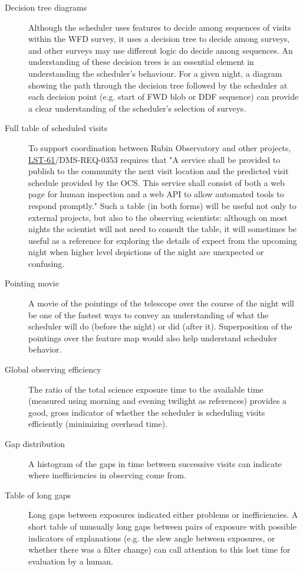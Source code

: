 \begin{description}
\item[{Decision tree diagrams}] Although the scheduler uses features to decide among sequences of visits within the WFD survey, it uses a decision tree to decide among surveys, and other surveys may use different logic do decide among sequences. An understanding of these decision trees is an essential element in understanding the scheduler's behaviour. For a given night, a diagram showing the path through the decision tree followed by the scheduler at each decision point (e.g. start of FWD blob or DDF sequence) can provide a clear understanding of the scheduler's selection of surveys.
\item[{Full table of scheduled visits}] To support coordination between Rubin Observatory and other projects, \href{https://ls.st/lse-61}{LST-61}/DMS-REQ-0353 requires that "A service shall be provided to publish to the community the next visit location and the predicted visit schedule provided by the OCS. This service shall consist of both a web page for human inspection and a web API to allow automated tools to respond promptly." Such a table (in both forms) will be useful not only to external projects, but also to the observing scientists: although on most nights the scientist will not need to consult the table, it will sometimes be useful as a reference for exploring the details of expect from the upcoming night when higher level depictions of the night are unexpected or confusing.
\item[{Pointing movie}] A movie of the pointings of the telescope over the course of the night will be one of the fastest ways to convey an understanding of what the scheduler will do (before the night) or did (after it). Superposition of the pointings over the feature map would also help understand scheduler behavior.
\item[{Global observing efficiency}] The ratio of the total science exposure time to the available time (measured using morning and evening twilight as references) provides a good, gross indicator of whether the scheduler is scheduling visits efficiently (minimizing overhead time).
\item[{Gap distribution}] A histogram of the gaps in time between successive visits can indicate where inefficiencies in observing come from.
\item[{Table of long gaps}] Long gaps between exposures indicated either problems or inefficiencies. A short table of unusually long gaps between pairs of exposure with possible indicators of explanations (e.g. the slew angle between exposures, or whether there was a filter change) can call attention to this lost time for evaluation by a human.

\end{description}
